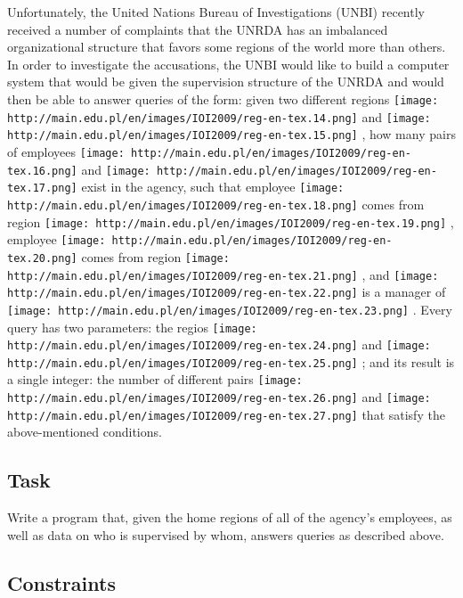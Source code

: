    Unfortunately, the United Nations Bureau of Investigations (UNBI)  recently received a number of complaints that the UNRDA has an  imbalanced organizational structure that favors some regions of the  world more than others. In order to investigate the accusations, the  UNBI would like to build a computer system that would be given the  supervision structure of the UNRDA and would then be able to answer  queries of the form: given two different regions   
\texttt{[image: http://main.edu.pl/en/images/IOI2009/reg-en-tex.14.png]}   and   
\texttt{[image: http://main.edu.pl/en/images/IOI2009/reg-en-tex.15.png]}   , how many pairs of employees   
\texttt{[image: http://main.edu.pl/en/images/IOI2009/reg-en-tex.16.png]}   and   
\texttt{[image: http://main.edu.pl/en/images/IOI2009/reg-en-tex.17.png]}   exist in the agency, such that employee   
\texttt{[image: http://main.edu.pl/en/images/IOI2009/reg-en-tex.18.png]}   comes from region   
\texttt{[image: http://main.edu.pl/en/images/IOI2009/reg-en-tex.19.png]}   , employee   
\texttt{[image: http://main.edu.pl/en/images/IOI2009/reg-en-tex.20.png]}   comes from region   
\texttt{[image: http://main.edu.pl/en/images/IOI2009/reg-en-tex.21.png]}   , and   
\texttt{[image: http://main.edu.pl/en/images/IOI2009/reg-en-tex.22.png]}   is a manager of   
\texttt{[image: http://main.edu.pl/en/images/IOI2009/reg-en-tex.23.png]}   . Every query has two parameters: the regios   
\texttt{[image: http://main.edu.pl/en/images/IOI2009/reg-en-tex.24.png]}   and   
\texttt{[image: http://main.edu.pl/en/images/IOI2009/reg-en-tex.25.png]}   ; and its result is a single integer: the number of different pairs   
\texttt{[image: http://main.edu.pl/en/images/IOI2009/reg-en-tex.26.png]}   and   
\texttt{[image: http://main.edu.pl/en/images/IOI2009/reg-en-tex.27.png]}   that satisfy the above-mentioned conditions.  

\subsection{   Task  }

   Write a program that, given the home regions of all of the agency's  employees, as well as data on who is supervised by whom, answers queries  as described above.  

\subsection{   Constraints  }


